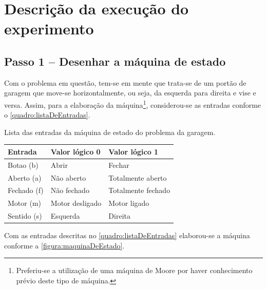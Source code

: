 \chapter{Descrição da execução do experimento}
	\section{Passo 1 – Desenhar a máquina de estado}
		Com o problema em questão, tem-se em mente que trata-se de um portão de garagem
		que move-se horizontalmente, ou seja, da esquerda para direita e vise e versa.
		Assim, para a elaboração da máquina\footnote{Preferiu-se a utilização de uma máquina de Moore
		por haver conhecimento prévio deste tipo de máquina.}, considerou-se as entradas conforme o
		\autoref{quadro:listaDeEntradas}.

		\begin{quadro}[H]
			\centering
			\caption{Lista das entradas da máquina de estado do problema da garagem.}
			\label{quadro:listaDeEntradas}
			\begin{tabular}{|l|l|l|}
			  \hline
			   \textbf{Entrada} & \textbf{Valor lógico 0}  & \textbf{Valor lógico 1}\\
			    \hline
				   Botao (b) & Abrir & Fechar \\
			   	\hline
			   		Aberto (a) & Não aberto & Totalmente aberto \\
			    \hline
					Fechado (f) & Não fechado & Totalmente fechado \\
			    \hline
			    	Motor (m) & Motor desligado & Motor ligado \\
			    \hline
					Sentido (s) & Esquerda & Direita \\
			   \hline
			\end{tabular}
		\end{quadro}

		Com as entradas descritas no \autoref{quadro:listaDeEntradas} elaborou-se a máquina conforme a
		\autoref{figura:maquinaDeEstado}.

